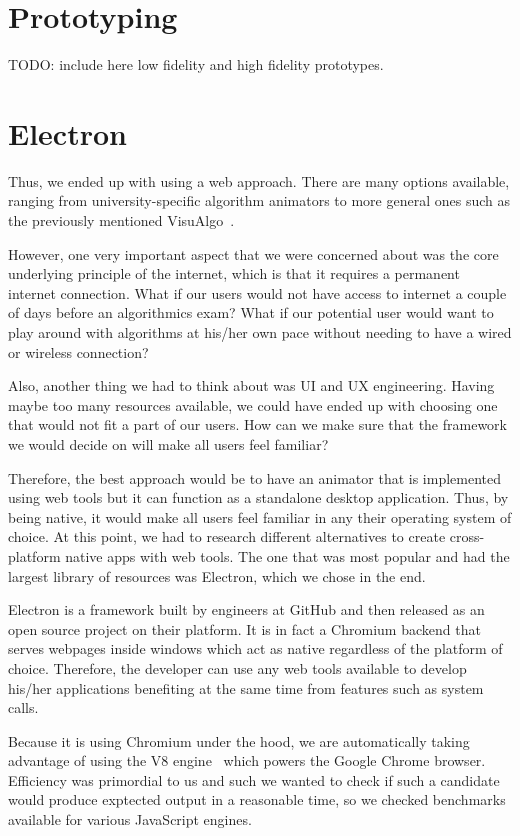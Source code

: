 \documentclass{l4proj}
\begin{document}
\section{Prototyping}

TODO: include here low fidelity and high fidelity prototypes.

\section{Electron}

Thus, we ended up with using a web approach. There are many options available, ranging from university-specific algorithm animators to more general ones such as the previously mentioned VisuAlgo~\cite{visualgo}.

However, one very important aspect that we were concerned about was the core underlying principle of the internet, which is that it requires a permanent internet connection. What if our users would not have access to internet a couple of days before an algorithmics exam? What if our potential user would want to play around with algorithms at his/her own pace without needing to have a wired or wireless connection?

Also, another thing we had to think about was UI and UX engineering. Having maybe too many resources available, we could have ended up with choosing one that would not fit a part of our users. How can we make sure that the framework we would decide on will make all users feel familiar?

Therefore, the best approach would be to have an animator that is implemented using web tools but it can function as a standalone desktop application. Thus, by being native, it would make all users feel familiar in any their operating system of choice. At this point, we had to research different alternatives to create cross-platform native apps with web tools. The one that was most popular and had the largest library of resources was Electron, which we chose in the end.

Electron is a framework built by engineers at GitHub and then released as an open source project on their platform. It is in fact a Chromium backend that serves webpages inside windows which act as native regardless of the platform of choice. Therefore, the developer can use any web tools available to develop his/her applications benefiting at the same time from features such as system calls.

Because it is using Chromium under the hood, we are automatically taking advantage of using the V8 engine~\cite{v8-chrome} which powers the Google Chrome browser. Efficiency was primordial to us and such we wanted to check if such a candidate would produce exptected output in a reasonable time, so we checked benchmarks available for various JavaScript engines.
\end{document}
